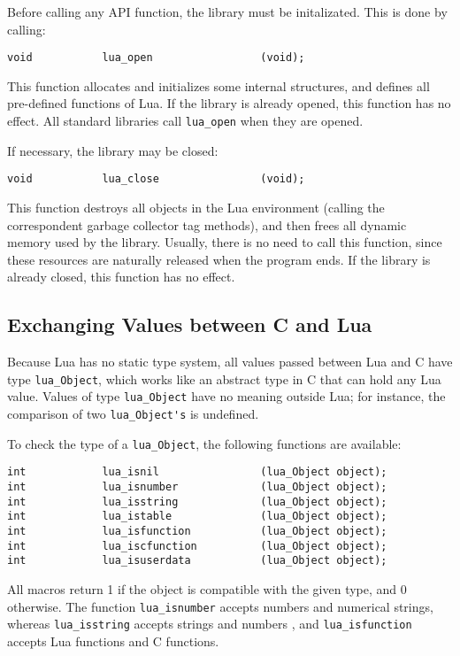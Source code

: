 Before calling any API function,
the library must be initalizated.
This is done by calling:
\begin{verbatim}
void           lua_open                 (void);
\end{verbatim}
This function allocates and initializes some internal structures,
and defines all pre-defined functions of Lua.
If the library is already opened,
this function has no effect.
All standard libraries call \verb|lua_open| when they are opened.

If necessary, the library may be closed:
\begin{verbatim}
void           lua_close                (void);
\end{verbatim}
This function destroys all objects in the Lua environment
(calling the correspondent garbage collector tag methods),
and then frees all dynamic memory used by the library.
Usually, there is no need to call this function,
since these resources are naturally released when the program ends.
If the library is already closed,
this function has no effect.

\subsection{Exchanging Values between C and Lua} \label{valuesCLua}
Because Lua has no static type system,
all values passed between Lua and C have type
\verb|lua_Object|,
which works like an abstract type in C that can hold any Lua value.
Values of type \verb|lua_Object| have no meaning outside Lua;
for instance,
the comparison of two \verb|lua_Object's| is undefined.

To check the type of a \verb|lua_Object|,
the following functions are available:
\begin{verbatim}
int            lua_isnil                (lua_Object object);
int            lua_isnumber             (lua_Object object);
int            lua_isstring             (lua_Object object);
int            lua_istable              (lua_Object object);
int            lua_isfunction           (lua_Object object);
int            lua_iscfunction          (lua_Object object);
int            lua_isuserdata           (lua_Object object);
\end{verbatim}
All macros return 1 if the object is compatible with the given type,
and 0 otherwise.
The function \verb|lua_isnumber| accepts numbers and numerical strings,
whereas
\verb|lua_isstring| accepts strings and numbers ,
and \verb|lua_isfunction| accepts Lua functions and C functions.

